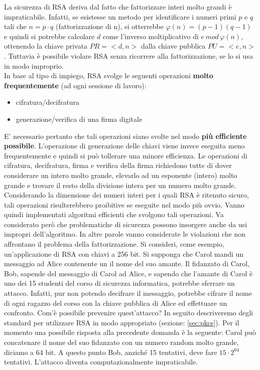 La sicurezza di RSA deriva dal fatto che fattorizzare interi molto grandi è impraticabile. Infatti, se esistesse un metodo per identificare i numeri primi $p$ e $q$ tali che $n = p \cdot q$ (fattorizzazione di n), si otterrebbe $\varphi(n) = (p-1)(q-1)$ e quindi si potrebbe calcolare $d$ come l'inverso moltiplicativo di $e \, mod \, \varphi(n)$, ottenendo la chiave privata $PR = <d,n>$ dalla chiave pubblica $PU = <e,n>$. 
\newline \newline
Tuttavia è possibile violare RSA senza ricorrere alla fattorizzazione, se lo si usa in modo improprio. \\
In base al tipo di impiego, RSA svolge le seguenti operazioni\textbf{ molto frequentemente} (ad ogni sessione di lavoro): 
\begin{itemize}
\item cifratura/decifratura
\item generazione/verifica di una firma digitale
\end{itemize}
E' necessario pertanto che tali operazioni siano svolte nel modo \textbf{più efficiente possibile}. L'operazione di generazione delle chiavi viene invece eseguita meno frequentemente e quindi si può tollerare una minore efficienza.
\newline \newline
Le operazioni di cifratura, decifratura, firma e verifica della firma richiedono tutte di dover considerare un intero molto grande, elevarlo ad un esponente (intero) molto grande e trovare il resto della divisione intera per un numero molto grande. Considerando la dimensione dei numeri interi per i quali RSA è ritenuto sicuro, tali operazioni risulterebbero proibitive se eseguite nel modo più ovvio. Vanno quindi implementati algoritmi efficienti che svolgono tali operazioni.
\newline \newline
Va considerato però che problematiche di sicurezza possono insorgere anche da usi impropri dell'algoritmo. In altre parole vanno considerate le violazioni che non affrontano il problema della fattorizzazione. Si consideri, come esempio, un'applicazione di RSA con chiavi a 256 bit.
\newline \newline
Si supponga che Carol mandi un messaggio ad Alice contenente un il nome del suo amante. Il fidanzato di Carol, Bob, sapende del messaggio di Carol ad Alice, e sapendo che l'amante di Carol è uno dei 15 studenti del corso di sicurezza informatica, potrebbe sferrare un attacco. Infatti, pur non potendo decifrare il messaggio, potrebbe cifrare il nome di ogni ragazzo del corso con la chiave pubblica di Alice ed effettuare un confronto.
\newline \newline
Com'è possibile prevenire quest'attacco? In seguito descriveremo degli standard per utilizzare RSA in modo appropriato (sezione: \ref{sec:pkcs}). Per il momento una possibile risposta alla precedente domanda è la seguente: Carol può concatenare il nome del suo fidanzato con un numero random molto grande, diciamo a 64 bit. A questo punto Bob, anziché 15 tentativi, deve fare $15 \cdot 2^{64}$ tentativi. L'attacco diventa computazionalmente impraticabile.

